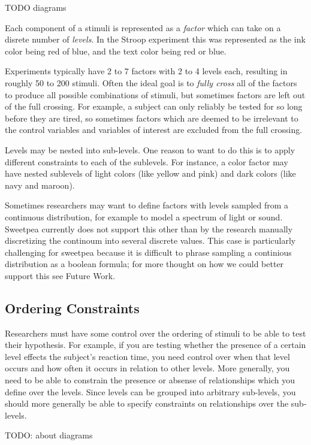 TODO diagrams

Each component of a stimuli is represented as a \emph{factor} which can take on a disrete number of \emph{levels}. In the Stroop experiment this was represented as the ink color being red of blue, and the text color being red or blue.

Experiments typically have 2 to 7 factors with 2 to 4 levels each, resulting in roughly 50 to 200 stimuli. Often the ideal goal is to \emph{fully cross} all of the factors to produce all possible combinations of stimuli, but sometimes factors are left out of the full crossing. For example, a subject can only reliably be tested for so long before they are tired, so sometimes factors which are deemed to be irrelevant to the control variables and variables of interest are excluded from the full crossing.

Levels may be nested into sub-levels. One reason to want to do this is to apply different constraints to each of the sublevels. For instance, a color factor may have nested sublevels of light colors (like yellow and pink) and dark colors (like navy and maroon).

Sometimes researchers may want to define factors with levels sampled from a continuous distribution, for example to model a spectrum of light or sound. Sweetpea currently does not support this other than by the research manually discretizing the continoum into several discrete values. This case is particularly challenging for sweetpea because it is difficult to phrase sampling a continious distribution as a boolean formula; for more thought on how we could better support this see Future Work.

\subsection{Ordering Constraints}

Researchers must have some control over the ordering of stimuli to be able to test their hypothesis. For example, if you are testing whether the presence of a certain level effects the subject's reaction time, you need control over when that level occurs and how often it occurs in relation to other levels. More generally, you need to be able to constrain the presence or absense of relationships which you define over the levels. Since levels can be grouped into arbitrary sub-levels, you should more generally be able to specify constraints on relationships over the sub-levels.

TODO: about diagrams

